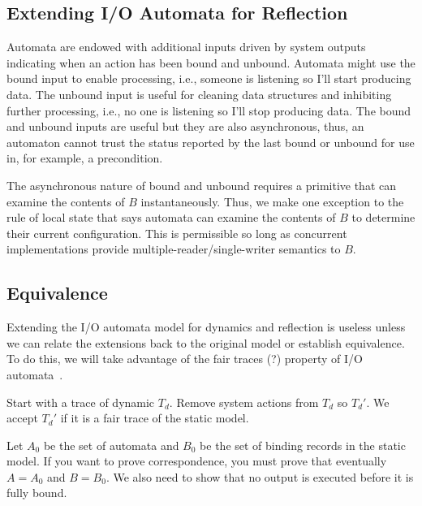 \documentclass[letterpaper]{article}
\begin{document}
\subsection{Extending I/O Automata for Reflection}

Automata are endowed with additional inputs driven by system outputs indicating when an action has been bound and unbound.
Automata might use the bound input to enable processing, i.e., someone is listening so I'll start producing data.
The unbound input is useful for cleaning data structures and inhibiting further processing, i.e., no one is listening so I'll stop producing data.
The bound and unbound inputs are useful but they are also asynchronous, thus, an automaton cannot trust the status reported by the last bound or unbound for use in, for example, a precondition.

The asynchronous nature of bound and unbound requires a primitive that can examine the contents of $B$ instantaneously.
Thus, we make one exception to the rule of local state that says automata can examine the contents of $B$ to determine their current configuration.
This is permissible so long as concurrent implementations provide multiple-reader/single-writer semantics to $B$.

\subsection{Equivalence}

Extending the I/O automata model for dynamics and reflection is useless unless we can relate the extensions back to the original model or establish equivalence.
To do this, we will take advantage of the fair traces (?) property of I/O automata~\cite{distributed_algorithms}.


Start with a trace of dynamic $T_d$.
Remove system actions from $T_d$ so $T_d'$.
We accept $T_d'$ if it is a fair trace of the static model.

Let $A_0$ be the set of automata and $B_0$ be the set of binding records in the static model.
If you want to prove correspondence, you must prove that eventually $A = A_0$ and $B = B_0$.
We also need to show that no output is executed before it is fully bound.

\end{document}
